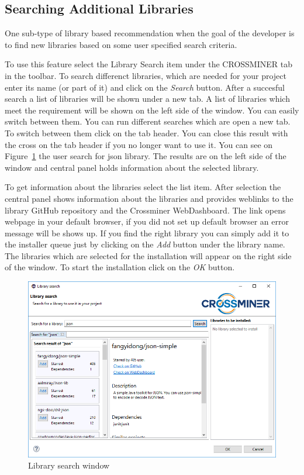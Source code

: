 \documentclass[11pt,a4paper]{book}
\begin{document}
\subsection{Searching Additional Libraries}

One sub-type of library based recommendation when the goal of the developer is to find new libraries based on some user specified search criteria.


To use this feature select the Library Search item under the CROSSMINER tab in the toolbar. To search differenct libraries, which are needed for your project enter its name (or part of it) and click on the \textit{Search} button. After a succesful search a list of libraries will be shown under a new tab. A list of libraries which meet the requirement will be shown on the left side of the window. You can easily switch between them. You can run different searches which are open a new tab. To switch between them click on the tab header. You can close this result with the cross on the tab header if you no longer want to use it. 
You can see on Figure~\ref{fig:librarySearchWindow} the user search for json library. The results are on the left side of the window and central panel holds information about the selected library.

To get information about the libraries select the list item. After selection the central panel shows information about the libraries and provides weblinks to the library GitHub repository and the Crossminer WebDashboard. The link opens webpage in your default browser, if you did not set up default browser an error message will be shows up.  If you find the right library you can simply add it to the installer queue just by clicking on the \textit{Add} button under the library name. The libraries which are selected for the installation will appear on the right side of the window. To start the installation click on the \textit{OK} button.

\begin{figure}[h]
	\centering
	\includegraphics[width=\linewidth]{pic/librarySearchWindowOpen.png}
	\caption{Library search window}
	\label{fig:librarySearchWindow}
\end{figure}
\end{document}
